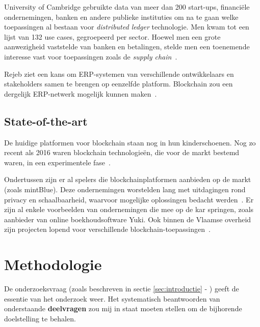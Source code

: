 University of Cambridge gebruikte data van meer dan 200 start-ups, financiële ondernemingen, banken en andere publieke instituties om na te gaan welke toepassingen al bestaan voor \textit{distributed ledger} technologie. Men kwam tot een lijst van 132 use cases, gegroepeerd per sector. Hoewel men een grote aanwezigheid vaststelde van banken en betalingen, stelde men een toenemende interesse vast voor toepassingen zoals de \textit{supply chain}~\autocite{Hileman2017}.

Rejeb ziet een kans om ERP-systemen van verschillende ontwikkelaars en stakeholders samen te brengen op eenzelfde platform. Blockchain zou een dergelijk ERP-netwerk mogelijk kunnen maken~\autocite{Rejeb2018}.

\subsection{State-of-the-art}
\label{sub:state-of-the-art}

De huidige platformen voor blockchain staan nog in hun kinderschoenen. Nog zo recent als 2016 waren blockchain technologieën, die voor de markt bestemd waren, in een experimentele fase~\autocite{Davidson2016}.

Ondertussen zijn er al spelers die blockchainplatformen aanbieden op de markt (zoals mintBlue). Deze ondernemingen worstelden lang met uitdagingen rond privacy en schaalbaarheid, waarvoor mogelijke oplossingen bedacht werden~\autocite{Kaptijn}. Er zijn al enkele voorbeelden van ondernemingen die mee op de kar springen, zoals aanbieder van online boekhoudsoftware Yuki. Ook binnen de Vlaamse overheid zijn projecten lopend voor verschillende blockchain-toepassingen~\autocite{Schiltz2018}.




\section{Methodologie}
\label{sec:methodologie}

De onderzoeksvraag (zoals beschreven in sectie \ref{sec:introductie} - ) geeft de essentie van het onderzoek weer. Het systematisch beantwoorden van onderstaande \textbf{deelvragen} zou mij in staat moeten stellen om de bijhorende doelstelling te behalen.

